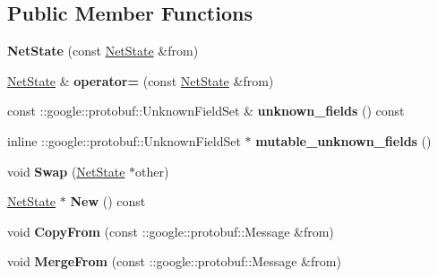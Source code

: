 \subsection*{Public Member Functions}
\begin{DoxyCompactItemize}
\item 
\mbox{\label{classcaffe_1_1_net_state_a4ed6fc10204f8b465358ea3d5d91e056}} 
{\bfseries Net\+State} (const \mbox{\hyperlink{classcaffe_1_1_net_state}{Net\+State}} \&from)
\item 
\mbox{\label{classcaffe_1_1_net_state_a71a4d8067a0e605e09ad5cfa65eea531}} 
\mbox{\hyperlink{classcaffe_1_1_net_state}{Net\+State}} \& {\bfseries operator=} (const \mbox{\hyperlink{classcaffe_1_1_net_state}{Net\+State}} \&from)
\item 
\mbox{\label{classcaffe_1_1_net_state_afd37393add738cbfd7c992efcdc9ea62}} 
const \+::google\+::protobuf\+::\+Unknown\+Field\+Set \& {\bfseries unknown\+\_\+fields} () const
\item 
\mbox{\label{classcaffe_1_1_net_state_a6de6e474fe7bf5316b4c853ffcc763d7}} 
inline \+::google\+::protobuf\+::\+Unknown\+Field\+Set $\ast$ {\bfseries mutable\+\_\+unknown\+\_\+fields} ()
\item 
\mbox{\label{classcaffe_1_1_net_state_aa61f61f1042e9e19cb4dc01239539ed8}} 
void {\bfseries Swap} (\mbox{\hyperlink{classcaffe_1_1_net_state}{Net\+State}} $\ast$other)
\item 
\mbox{\label{classcaffe_1_1_net_state_aaffa67a81000673b92e3e2869196c23e}} 
\mbox{\hyperlink{classcaffe_1_1_net_state}{Net\+State}} $\ast$ {\bfseries New} () const
\item 
\mbox{\label{classcaffe_1_1_net_state_a428b826cdd4815d84b8816ffce06eb4f}} 
void {\bfseries Copy\+From} (const \+::google\+::protobuf\+::\+Message \&from)
\item 
\mbox{\label{classcaffe_1_1_net_state_afcdb44a71c6613176235da98fc0bf72b}} 
void {\bfseries Merge\+From} (const \+::google\+::protobuf\+::\+Message \&from)

\end{DoxyCompactItemize}
